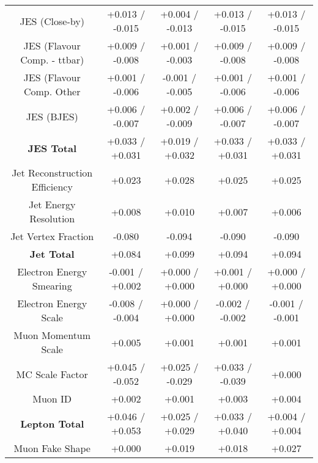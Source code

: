 \begin{table}[htbp]
\begin{center}
\begin{tabular}{|c|c|c|c|c|}
JES (Close-by)                        &+0.013   / -0.015   & +0.004   / -0.013   & +0.013   / -0.015   & +0.013   / -0.015  \\
JES (Flavour Comp. - ttbar)           &+0.009   / -0.008   & +0.001   / -0.003   & +0.009   / -0.008   & +0.009   / -0.008  \\
JES (Flavour Comp. Other              &+0.001   / -0.006   & -0.001   / -0.005   & +0.001   / -0.006   & +0.001   / -0.006  \\
JES (BJES)                            &+0.006   / -0.007   & +0.002   / -0.009   & +0.006   / -0.007   & +0.006   / -0.007  \\
\hline
\textbf{JES Total}                    &+0.033   / +0.031   & +0.019   / +0.032   & +0.033   / +0.031   & +0.033   / +0.031  \\
\hline
Jet Reconstruction Efficiency         &+0.023              & +0.028              & +0.025              & +0.025             \\
Jet Energy Resolution                 &+0.008              & +0.010              & +0.007              & +0.006             \\
Jet Vertex Fraction                   &-0.080              & -0.094              & -0.090              & -0.090             \\
\hline
\textbf{Jet Total}                    &+0.084              & +0.099              & +0.094              & +0.094             \\
\hline
Electron Energy Smearing              &-0.001   / +0.002   & +0.000   / +0.000   & +0.001   / +0.000   & +0.000   / +0.000  \\
Electron Energy Scale                 &-0.008   / -0.004   & +0.000   / +0.000   & -0.002   / -0.002   & -0.001   / -0.001  \\
Muon Momentum Scale                   &+0.005              & +0.001              & +0.001              & +0.001             \\
MC Scale Factor                       &+0.045   / -0.052   & +0.025   / -0.029   & +0.033   / -0.039   & +0.000             \\
Muon ID                               &+0.002              & +0.001              & +0.003              & +0.004             \\
\hline
\textbf{Lepton Total}                 &+0.046   / +0.053   & +0.025   / +0.029   & +0.033   / +0.040   & +0.004   / +0.004  \\
\hline
Muon Fake Shape                       &+0.000              & +0.019              & +0.018              & +0.027             \\

\end{tabular}
\end{center}
\end{table}
